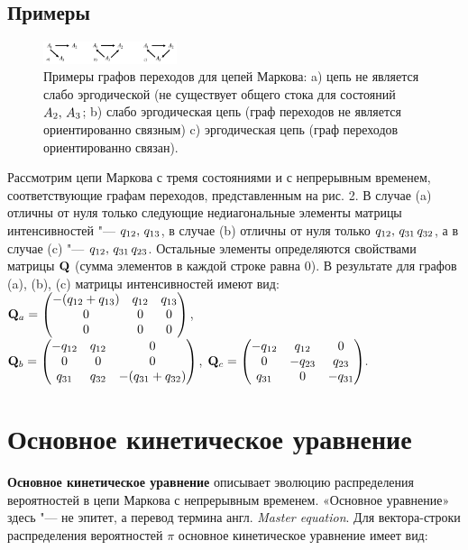 \documentclass{article}
\begin{document}
\subsection{Примеры}
\begin{figure}
	\begin{center}
		\includegraphics[width = 0.35\textwidth]{image_2.jpg}
	\end{center}
	\caption{Примеры графов переходов для цепей Маркова: a) цепь не является слабо эргодической (не существует общего стока для состояний ${\displaystyle A_{2},\,A_{3}}$; b) слабо эргодическая цепь (граф переходов не является ориентированно связным) c) эргодическая цепь (граф переходов ориентированно связан).}
\end{figure}
Рассмотрим цепи Маркова с тремя состояниями и с непрерывным временем, соответствующие графам переходов, представленным на рис. 2. 
В случае (a) отличны от нуля только следующие недиагональные элементы матрицы интенсивностей "--- ${\displaystyle q_{12},\,q_{13}}$, в случае (b) отличны от нуля только ${\displaystyle q_{12},\,q_{31}\,q_{32}}$, а в случае (c) "--- ${\displaystyle q_{12},\,q_{31}\,q_{23}}$. Остальные элементы определяются свойствами матрицы ${\displaystyle \mathbf {Q} }$ (сумма элементов в каждой строке равна 0). В результате для графов (a), (b), (c) матрицы интенсивностей имеют вид: ${\displaystyle \mathbf {Q} _{a}={\begin{pmatrix}-(q_{12}+q_{13})&q_{12}&q_{13}\\0&0&0\\0&0&0\end{pmatrix}}}$,\\
${\displaystyle \mathbf {Q} _{b}={\begin{pmatrix}-q_{12}&q_{12}&0\\0&0&0\\q_{31}&q_{32}&-(q_{31}+q_{32})\end{pmatrix}}}$, ${\displaystyle \mathbf {Q} _{c}={\begin{pmatrix}-q_{12}&q_{12}&0\\0&-q_{23}&q_{23}\\q_{31}&0&-q_{31}\end{pmatrix}}.}$

\section{Основное кинетическое уравнение}
\textbf{Основное кинетическое уравнение} описывает эволюцию распределения вероятностей в цепи Маркова с непрерывным временем. «Основное уравнение» здесь "--- не эпитет, а перевод термина англ. \textit{Master equation}. Для вектора-строки распределения вероятностей $\pi$  основное кинетическое уравнение имеет вид:
\end{document}
